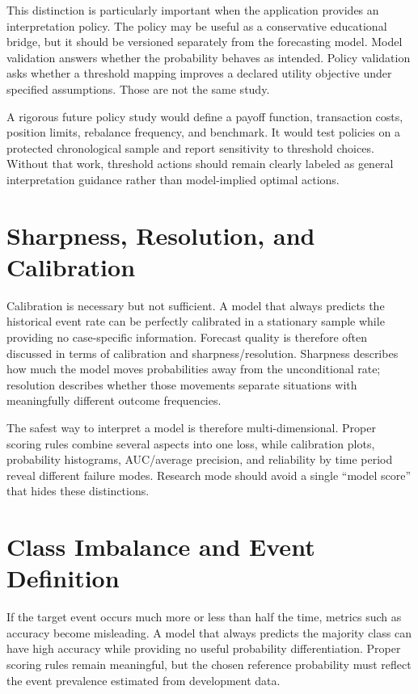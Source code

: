 \documentclass[11pt]{article}
\begin{document}
This distinction is particularly important when the application provides an interpretation policy. The policy may be useful as a conservative educational bridge, but it should be versioned separately from the forecasting model. Model validation answers whether the probability behaves as intended. Policy validation asks whether a threshold mapping improves a declared utility objective under specified assumptions. Those are not the same study.

A rigorous future policy study would define a payoff function, transaction costs, position limits, rebalance frequency, and benchmark. It would test policies on a protected chronological sample and report sensitivity to threshold choices. Without that work, threshold actions should remain clearly labeled as general interpretation guidance rather than model-implied optimal actions.

\section{Sharpness, Resolution, and Calibration}
Calibration is necessary but not sufficient. A model that always predicts the historical event rate can be perfectly calibrated in a stationary sample while providing no case-specific information. Forecast quality is therefore often discussed in terms of calibration and sharpness/resolution. Sharpness describes how much the model moves probabilities away from the unconditional rate; resolution describes whether those movements separate situations with meaningfully different outcome frequencies.

The safest way to interpret a model is therefore multi-dimensional. Proper scoring rules combine several aspects into one loss, while calibration plots, probability histograms, AUC/average precision, and reliability by time period reveal different failure modes. Research mode should avoid a single ``model score'' that hides these distinctions.

\section{Class Imbalance and Event Definition}
If the target event occurs much more or less than half the time, metrics such as accuracy become misleading. A model that always predicts the majority class can have high accuracy while providing no useful probability differentiation. Proper scoring rules remain meaningful, but the chosen reference probability must reflect the event prevalence estimated from development data.
\end{document}
